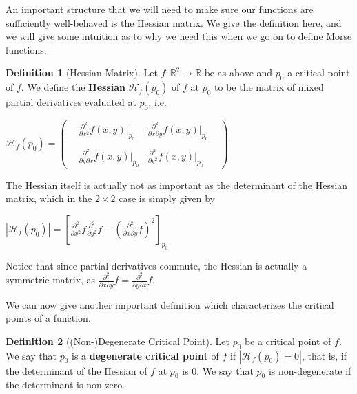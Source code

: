 \documentclass[12pt]{article}
\newcommand{\cH}{{\mathcal H}}
\newcommand{\bR}{{\mathbb R}}
\theoremstyle{definition}
\newtheorem{definition}{Definition}
\begin{document}
An important structure that we will need to make sure our functions are sufficiently well-behaved is the Hessian matrix. We give the definition here, and we will give some intuition as to why we need this when we go on to define Morse functions. 
\begin{definition}[Hessian Matrix]
	Let $f:\bR^2\rightarrow \bR$ be as above and $p_0$ a critical point of $f$. We define the \textbf{Hessian} $\cH_f(p_0)$ of $f$ at $p_0$ to be the matrix of mixed partial derivatives evaluated at $p_0$, i.e.
	\begin{center}
		$\cH_f(p_0) = \begin{pmatrix}
			&\frac{\partial^2}{\partial x^2}f(x,y)|_{p_0} & \frac{\partial^2}{\partial x \partial y}f(x,y)|_{p_0}&  \\
			\\
			&\frac{\partial^2}{\partial y \partial x}f(x,y)|_{p_0} & \frac{\partial^2}{\partial y^2}f(x,y)|_{p_0} &
			\end{pmatrix}$
	\end{center}
\end{definition}

\noindent
The Hessian itself is actually not as important as the determinant of the Hessian matrix, which in the $2\times 2$ case is simply given by 
\begin{center}
	$|\cH_f(p_0)| = [\frac{\partial^2}{\partial x^2}f \frac{\partial^2}{\partial y^2}f - (\frac{\partial^2}{\partial x \partial y}f)^2]_{p_0}$
\end{center}
Notice that since partial derivatives commute, the Hessian is actually a symmetric matrix, as $\frac{\partial^2}{\partial x \partial y}f = \frac{\partial^2}{\partial y \partial x}f$. 

We can now give another important definition which characterizes the critical points of a function. 
\begin{definition}[(Non-)Degenerate Critical Point]
	Let $p_0$ be a critical point of $f$. We say that $p_0$ is a \textbf{degenerate critical point} of $f$ if $|\cH_f(p_0) = 0|$, that is, if the determinant of the Hessian of $f$ at $p_0$ is 0. We say that $p_0$ is non-degenerate if the determinant is non-zero. 
\end{definition}
\end{document}
